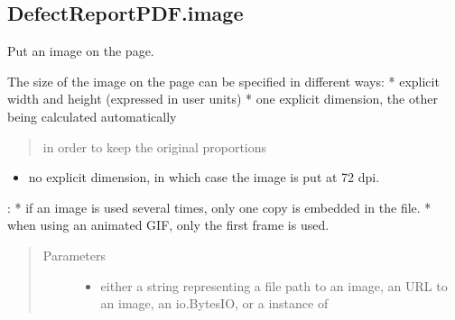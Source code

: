 \documentclass[letterpaper,10pt,english]{sphinxmanual}
\begin{document}
\begin{fulllineitems}
\begin{fulllineitems}
\end{fulllineitems}



\subsection{DefectReportPDF.image}
\label{\detokenize{generated/quality_assessment.quality_pdf_report.DefectReportPDF.image:defectreportpdf-image}}\label{\detokenize{generated/quality_assessment.quality_pdf_report.DefectReportPDF.image::doc}}

\begin{fulllineitems}
\label{\detokenize{generated/quality_assessment.quality_pdf_report.DefectReportPDF.image:quality_assessment.quality_pdf_report.DefectReportPDF.image}}
\sphinxAtStartPar
Put an image on the page.

\sphinxAtStartPar
The size of the image on the page can be specified in different ways:
* explicit width and height (expressed in user units)
* one explicit dimension, the other being calculated automatically
\begin{quote}

\sphinxAtStartPar
in order to keep the original proportions
\end{quote}
\begin{itemize}
\item {} 
\sphinxAtStartPar
no explicit dimension, in which case the image is put at 72 dpi.

\end{itemize}

\sphinxAtStartPar
{}:
* if an image is used several times, only one copy is embedded in the file.
* when using an animated GIF, only the first frame is used.
\begin{quote}\begin{description}
\item[{Parameters}] \leavevmode\begin{itemize}
\item {} 
\sphinxAtStartPar
{} \textendash{} either a string representing a file path to an image, an URL to an image,
an io.BytesIO, or a instance of 


\end{itemize}
\end{description}
\end{quote}
\end{fulllineitems}
\end{fulllineitems}
\end{document}
